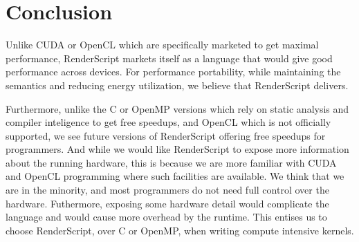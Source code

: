 \section{Conclusion}

Unlike CUDA or OpenCL which are specifically marketed to get maximal performance, 
RenderScript markets itself as a language that would give good performance across devices.
For performance portability, while maintaining the semantics and reducing energy utilization,
	we believe that RenderScript delivers.

Furthermore, unlike the C or OpenMP versions which rely on static analysis and compiler
	inteligence to get free speedups, and OpenCL which is not officially supported,
	we see future versions of RenderScript offering free speedups for programmers.
And while we would like RenderScript to expose more information about the running hardware,
	this is because we are more familiar with CUDA and OpenCL programming where such facilities
	are available.
We think that we are in the minority, and most programmers do not need full control over the hardware.
Futhermore, exposing some hardware detail would complicate the language and would cause
	more overhead by the runtime.
This entises us to choose RenderScript, over C or OpenMP, when writing compute intensive
	kernels.
